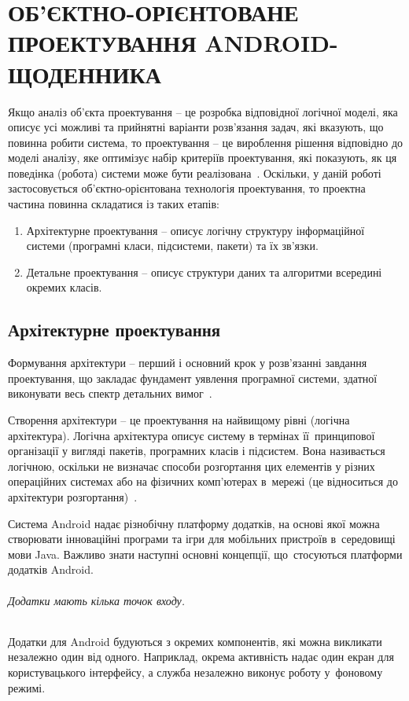 \documentclass[../main.tex]{subfiles}
\begin{document}
\chapter{ОБ’ЄКТНО-ОРІЄНТОВАНЕ ПРОЕКТУВАННЯ ANDROID-ЩОДЕННИКА}

Якщо аналіз об’єкта проектування – це розробка відповідної логічної моделі, яка описує усі можливі та прийнятні варіанти розв’язання задач, які вказують, що повинна робити система, то проектування – це вироблення рішення відповідно до моделі аналізу, яке оптимізує набір критеріїв проектування, які  показують, як ця поведінка (робота) системи може бути реалізована~\cite{diploma_guidelines}.
Оскільки, у даній роботі застосовується \mbox{об’єктно-орієнтована} технологія проектування, то проектна частина повинна складатися із таких етапів:

\begin{enumerate}
	\item Архітектурне проектування – описує логічну структуру інформаційної системи (програмні класи, підсистеми,  пакети) та їх зв’язки.
	\item Детальне проектування – описує структури даних та алгоритми всередині окремих класів. 
\end{enumerate}

\section{Архітектурне проектування}
Формування архітектури – перший і основний крок у розв’язанні завдання проектування, що закладає фундамент уявлення програмної системи, здатної виконувати весь спектр детальних вимог~\cite{diploma_guidelines2}.

Створення архітектури – це проектування на найвищому рівні (логічна архітектура). Логічна архітектура описує систему в термінах її~принципової організації у вигляді пакетів, програмних класів і підсистем. Вона називається логічною, оскільки не визначає способи розгортання цих елементів у різних операційних системах або на фізичних комп’ютерах в~мережі (це відноситься до архітектури розгортання)~\cite{diploma_guidelines}.

Система Android надає різнобічну платформу додатків, на основі якої можна створювати інноваційні програми та ігри для мобільних пристроїв в~середовищі мови Java. Важливо знати наступні основні концепції, що~стосуються платформи додатків Android.

\subparagraph{Додатки мають кілька точок входу.}
Додатки для Android будуються з окремих компонентів, які можна викликати незалежно один від одного. Наприклад, окрема активність надає один екран для користувацького інтерфейсу, а служба незалежно виконує роботу у~фоновому режимі.
	
\end{document}
